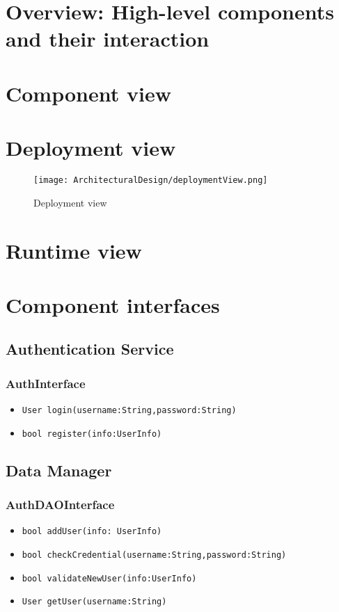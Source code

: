 \section{Overview: High-level components and their interaction}
\label{s:overview}%

\section{Component view}
\label{s:component-view}%

\section{Deployment view}
\label{s:deployment-view}%

\begin{figure}[H]
    \label{fig:deployment-view}
    \centering
    \texttt{[image: ArchitecturalDesign/deploymentView.png]}
    \caption{Deployment view}
\end{figure}

\section{Runtime view}
\label{s:runtime-view}%

\section{Component interfaces}
\label{s:component-interfaces}%


\subsection{Authentication Service}
\subsubsection{AuthInterface}
\begin{itemize}
    \item \texttt{User login(username:String,password:String)}
    \item \texttt{bool register(info:UserInfo)}
\end{itemize}

\subsection{Data Manager}
\subsubsection{AuthDAOInterface}
\begin{itemize}
    \item \texttt{bool addUser(info: UserInfo)}
    \item \texttt{bool checkCredential(username:String,password:String)}
    \item \texttt{bool validateNewUser(info:UserInfo)}
    \item \texttt{User getUser(username:String)}
\end{itemize}

